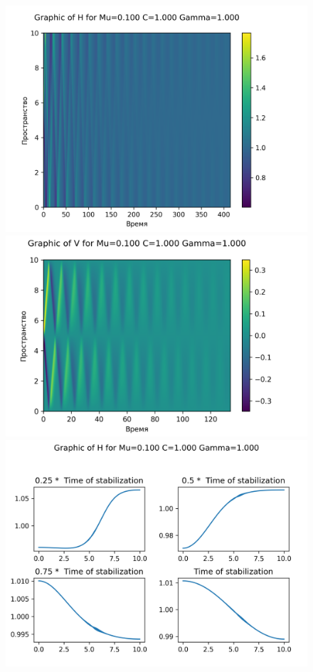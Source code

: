 \begin{figure}[H]
	\centering
	\includegraphics[scale=0.5]{../graphs_data_nonsmooth_2/value/Graph_H_mu0.100_C1.000_gamma1.000.png}
	\includegraphics[scale=0.5]{../graphs_data_nonsmooth_2/value/Graph_V_mu0.100_C1.000_gamma1.000.png}	
	\includegraphics[scale=0.5]{../graphs_data_nonsmooth_2/slices/Graph_H_mu0.100_C1.000_gamma1.000.png}

\end{figure}
